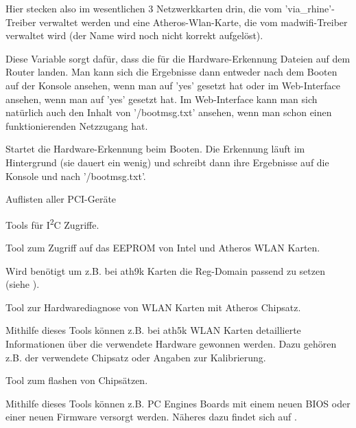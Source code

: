 Hier stecken also im wesentlichen 3 Netzwerkkarten drin, die vom
'via\_rhine'-Treiber verwaltet werden und eine Atheros-Wlan-Karte, die
vom madwifi-Treiber verwaltet wird (der Name wird noch nicht korrekt
aufgelöst).

\begin{description}

   Diese
  Variable sorgt dafür, dass die für die Hardware-Erkennung Dateien auf
  dem Router landen. Man kann sich die Ergebnisse dann entweder nach
  dem Booten auf der Konsole ansehen, wenn man
   auf 'yes' gesetzt hat oder im
  Web-Interface ansehen, wenn man  auf 'yes' gesetzt
  hat. Im Web-Interface kann man sich natürlich auch den Inhalt von
  '/bootmsg.txt' ansehen, wenn man schon einen funktionierenden
  Netzzugang hat.

   Startet die
  Hardware-Erkennung beim Booten. Die Erkennung läuft im Hintergrund
  (sie dauert ein wenig) und schreibt dann ihre Ergebnisse auf die
  Konsole und nach '/bootmsg.txt'.

 Auflisten aller PCI-Geräte

 Tools für
I\textsuperscript{2}C Zugriffe.

 Tool zum Zugriff auf das
EEPROM von Intel und Atheros WLAN Karten.

Wird benötigt um z.B. bei ath9k Karten die Reg-Domain passend zu setzen
(siehe ).

 Tool zur Hardwarediagnose von
WLAN Karten mit Atheros Chipsatz.

Mithilfe dieses Tools können z.B. bei ath5k WLAN Karten detaillierte
Informationen über die verwendete Hardware gewonnen werden. Dazu gehören z.B.
der verwendete Chipsatz oder Angaben zur Kalibrierung.

 Tool zum flashen von Chipsätzen.

Mithilfe dieses Tools können z.B. PC Engines Boards mit einem neuen BIOS oder einer neuen 
Firmware versorgt werden. Näheres dazu findet sich auf .

\end{description}


